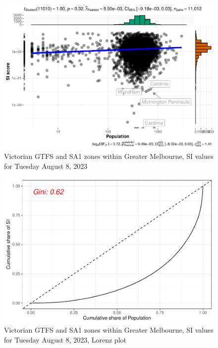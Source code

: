 \documentclass[preprint, 3p,
authoryear]{elsarticle} %
\begin{document}
\begin{figure}
\centering
\includegraphics{Leveraging_GTFS_to_assess_transit_supply_Transport_Geography_files/figure-latex/gghistostats_greater_melbourne_230808-1.pdf}
\caption{Victorian GTFS and SA1 zones within Greater Melbourne, SI
values for Tuesday August 8, 2023}
\end{figure}

\begin{figure}
\centering
\includegraphics{Leveraging_GTFS_to_assess_transit_supply_Transport_Geography_files/figure-latex/Gini_coefficients-1.pdf}
\caption{Victorian GTFS and SA1 zones within Greater Melbourne, SI
values for Tuesday August 8, 2023, Lorenz plot}
\end{figure}
\end{document}
